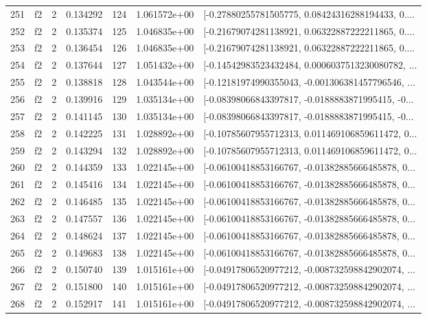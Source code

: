 \begin{tabular}{lllrlrl}
251 &  f2 &   2 &  0.134292 &  124 &  1.061572e+00 &  [-0.27880255781505775, 0.08424316288194433, 0.... \\
252 &  f2 &   2 &  0.135374 &  125 &  1.046835e+00 &  [-0.21679074281138921, 0.06322887222211865, 0.... \\
253 &  f2 &   2 &  0.136454 &  126 &  1.046835e+00 &  [-0.21679074281138921, 0.06322887222211865, 0.... \\
254 &  f2 &   2 &  0.137644 &  127 &  1.051432e+00 &  [-0.14542983523432484, 0.0006037513230080782, ... \\
255 &  f2 &   2 &  0.138818 &  128 &  1.043544e+00 &  [-0.12181974990355043, -0.001306381457796546, ... \\
256 &  f2 &   2 &  0.139916 &  129 &  1.035134e+00 &  [-0.08398066843397817, -0.0188883871995415, -0... \\
257 &  f2 &   2 &  0.141145 &  130 &  1.035134e+00 &  [-0.08398066843397817, -0.0188883871995415, -0... \\
258 &  f2 &   2 &  0.142225 &  131 &  1.028892e+00 &  [-0.10785607955712313, 0.011469106859611472, 0... \\
259 &  f2 &   2 &  0.143294 &  132 &  1.028892e+00 &  [-0.10785607955712313, 0.011469106859611472, 0... \\
260 &  f2 &   2 &  0.144359 &  133 &  1.022145e+00 &  [-0.06100418853166767, -0.01382885666485878, 0... \\
261 &  f2 &   2 &  0.145416 &  134 &  1.022145e+00 &  [-0.06100418853166767, -0.01382885666485878, 0... \\
262 &  f2 &   2 &  0.146485 &  135 &  1.022145e+00 &  [-0.06100418853166767, -0.01382885666485878, 0... \\
263 &  f2 &   2 &  0.147557 &  136 &  1.022145e+00 &  [-0.06100418853166767, -0.01382885666485878, 0... \\
264 &  f2 &   2 &  0.148624 &  137 &  1.022145e+00 &  [-0.06100418853166767, -0.01382885666485878, 0... \\
265 &  f2 &   2 &  0.149683 &  138 &  1.022145e+00 &  [-0.06100418853166767, -0.01382885666485878, 0... \\
266 &  f2 &   2 &  0.150740 &  139 &  1.015161e+00 &  [-0.04917806520977212, -0.008732598842902074, ... \\
267 &  f2 &   2 &  0.151800 &  140 &  1.015161e+00 &  [-0.04917806520977212, -0.008732598842902074, ... \\
268 &  f2 &   2 &  0.152917 &  141 &  1.015161e+00 &  [-0.04917806520977212, -0.008732598842902074, ... \\

\end{tabular}
